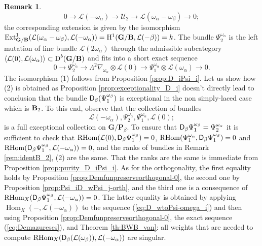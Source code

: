 \documentclass[sn-mathphys-num]{sn-jnl}%
\newcommand{\Uu}{\mathcal U}
\newcommand{\Ll}{\mathcal L}
\newcommand{\Ext}{{\mathrm{Ext}}}
\newcommand*{\Dd}{\mathop{\mathrm D\kern0pt}\nolimits}
\newcommand*{\Hom}{\mathop{\mathrm {Hom}}\nolimits}
\newcommand*{\RHom}{\mathop{\mathrm {RHom}}\nolimits}
\newcommand{\bg}{\mathbf G}
\newcommand{\fb}{\mathbf B}
\newcommand{\bp}{\mathbf P}
\theoremstyle{definition}
\newtheorem{remark}[theorem]{Remark}
\begin{document}
\begin{remark}
{\begin{equation}\label{eq:weights_of_U2}
0\rightarrow \Ll (-\omega _{\alpha})\rightarrow \Uu _2\rightarrow \Ll (\omega _{\alpha}-\omega _{\beta})\rightarrow 0;
\end{equation}
the corresponding extension is given by the isomorphism $\Ext ^1_{ \bg/\fb}(\Ll (\omega _{\alpha}-\omega _{\beta}),\Ll (-\omega _{\alpha}))={\rm H}^1( \bg/ \fb,\Ll (-\beta))=k$. The bundle $\Psi _2^{\omega _{\alpha}}$ is the left mutation of line bundle $\Ll (2\omega _{\alpha})$ through the admissible subcategory $\langle \Ll (0),\Ll (\omega _{\alpha})\rangle\subset \Dd ^b( \bg/ \fb)$ and fits into a short exact sequence 
\begin{equation}
0\rightarrow \Psi _2^{\omega _{\alpha}}\rightarrow \Lambda ^2\nabla _{\omega _{\alpha}}\otimes \Ll (0)\rightarrow \Psi _1^{\omega _{\alpha}}\otimes \Ll (\omega _{\alpha})\rightarrow 0.
\end{equation}
The isomorphism (1) follows from Proposition \ref{prop:D_iPsi_i}. 
Let us show how (2) is obtained as Proposition \ref{prop:exceptionality_D_i} doesn't directly lead to conclusion that the bundle ${\sf D}_{\beta}(\Psi _1^{\omega _{\beta}})$ is exceptional in the non simply-laced case which is ${\bf B}_2$. To this end, observe that the collection of bundles 
\begin{equation}
\Ll (-\omega _{\alpha}),\Psi _2^{\omega _{\alpha}},\Psi _1^{\omega _{\alpha}},\Ll (0);
\end{equation}
is a full exceptional collection on $ \bg/{\bp} _{\beta}$. To ensure that ${\sf D}_{\beta}\Psi _1^{\omega _{\beta}}=\Psi _2^{\omega _{\alpha}}$ it is sufficient to check that $\RHom (\Ll (0),{\sf D}_{\beta}\Psi _1^{\omega _{\beta}})=0$, $\RHom (\Psi _1^{\omega _{\alpha}},{\sf D}_{\beta}\Psi _1^{\omega _{\beta}})=0$ and $\RHom ({\sf D}_{\beta}\Psi _1^{\omega _{\beta}},\Ll (-\omega _{\alpha}))=0$, and the ranks of bundles in Remark \ref{rem:identB_2}, (2) are the same. That the ranks are the same is immediate from Proposition \ref{prop:purity_D_iPsi_i}. As for the orthogonality, 
the first equality holds by Proposition \ref{prop:Demfunpreserveorthogonal-0}, the second one by Proposition \ref{prop:Psi_iD_wPsi_j-orth}, and the third one is a consequence of $\RHom _X({\sf D}_{\beta}\Psi _1^{\omega _{\beta}},\Ll (-\omega _{\alpha}))=0$. The latter equality is obtained by applying $\Hom _X(-,\Ll (-\omega _{\alpha}))$ to the sequence (\ref{eq:D_wtoPsi-omega_i}) and then using Proposition \ref{prop:Demfunpreserveorthogonal-0}, the exact sequence (\ref{eq:Demazureses}), and Theorem \ref{th:BWB_van}: all weights that are needed to compute $\RHom _X({\sf D}_{\beta}(\Ll (\omega _{\beta})),\Ll (-\omega _{\alpha}))$ are singular.}
\end{remark}
\end{document}
